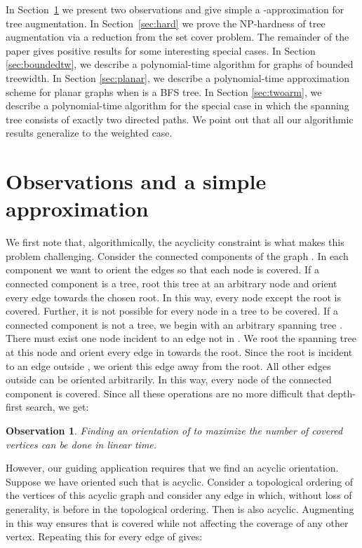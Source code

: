 \documentclass{article}
\newtheorem{obs}[theorem]{Observation}
\begin{document}
In Section~\ref{sec:comp} we present two observations and give simple a
-approximation for {\sc tree augmentation}.  In
Section~\ref{sec:hard} we prove the NP-hardness of {\sc tree augmentation} via a reduction from
the {\sc set cover} problem. The remainder of the paper gives positive
results for some interesting special cases.  In Section
\ref{sec:boundedtw}, we describe a polynomial-time algorithm for
graphs of bounded treewidth.  In Section \ref{sec:planar}, we describe
a polynomial-time approximation scheme for planar graphs when  is a
BFS tree. In Section \ref{sec:twoarm}, we describe a polynomial-time
algorithm for the special case in which the spanning tree consists of
exactly two directed paths.  We point out
that all our algorithmic results generalize to the weighted case.

\section{Observations and a simple approximation}\label{sec:comp}

We first note that, algorithmically, the acyclicity constraint is what
makes this problem challenging.  Consider the connected components of
the graph .  In each component we want to orient the edges
so that each node is covered.  If a connected component is a tree,
root this tree at an arbitrary node and orient every edge towards the
chosen root.  In this way, every node except the root is covered.
Further, it is not possible for every node in a tree to be covered.
If a connected component is not a tree, we begin with an arbitrary
spanning tree .  There must exist one node incident to an edge not
in .  We root the spanning tree  at this node and orient every
edge in  towards the root.  Since the root is incident to an edge
outside , we orient this edge away from the root.  All other edges
outside  can be oriented arbitrarily.  In this way, every node of
the connected component is covered.   Since all these operations are
no more difficult that depth-first search, we get:

\begin{obs}\label{obs:cyclic}
  Finding an orientation of  to maximize the number of covered
  vertices can be done in linear time.
\end{obs}

However, our guiding application requires that we find an acyclic
orientation.  Suppose we have oriented  such that
 is acyclic.  Consider
a topological ordering of the vertices of this acyclic graph and consider any
edge  in which, without loss of generality,
 is before  in the topological ordering.  Then
 is also acyclic.  Augmenting  in this way ensures that  is
covered while not affecting the coverage of any other vertex.  Repeating this for every
edge of  gives:
\end{document}
